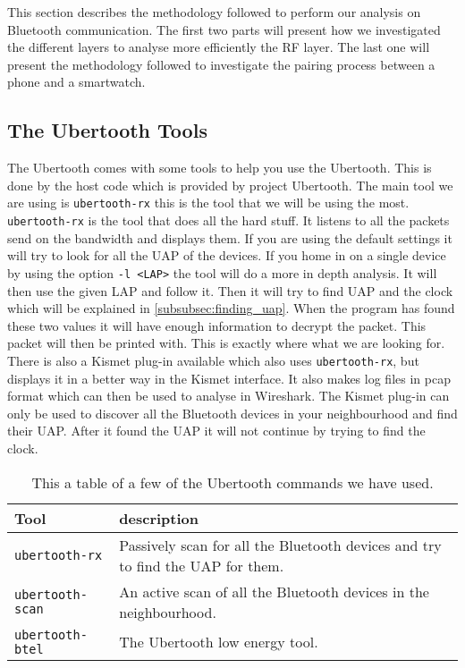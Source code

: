 This section describes the methodology followed to perform our analysis on Bluetooth communication. The first two parts will present how we investigated the different layers to analyse more efficiently the RF layer. The last one will present the methodology followed to investigate the pairing process between a phone and a smartwatch.


\subsection{The Ubertooth Tools}
\label{subsubsec:ubertooth_tools}
The Ubertooth comes with some tools to help you use the Ubertooth. This is done by the host code which is provided by project Ubertooth. 
The main tool we are using is \verb|ubertooth-rx|  this is the tool that we will be using the most. \verb|ubertooth-rx| is the tool that does all the hard stuff. It listens to all the packets send on the bandwidth and displays them. If you are using the default settings it will try to look for all the UAP of the devices. If you home in on a single device by using the option \verb|-l <LAP>| the tool will do a more in depth analysis. It will then use the given LAP and follow it. Then it will try to find UAP and the clock which will be explained in \ref{subsubsec:finding_uap}. When the program has found these two values it will have enough information to decrypt the packet. This packet will then be printed with. This is exactly where what we are looking for. \pend There is also a Kismet plug-in available which also uses \verb|ubertooth-rx|, but displays it in a better way in the Kismet interface. It also makes log files in pcap format which can then be used to analyse in Wireshark. The Kismet plug-in can only be used to discover all the Bluetooth devices in your neighbourhood and find their UAP. After it found the UAP it will not continue by trying to find the clock.

\begin{table}
\begin{tabular}{|l|l|}
\hline
Tool & description \\
\hline
\verb|ubertooth-rx| & Passively scan for all the Bluetooth devices and try to find the UAP for them. \\
\hline
\verb|ubertooth-scan| & An active scan of all the Bluetooth devices in the neighbourhood.  \\
\hline
\verb|ubertooth-btel| & The Ubertooth low energy tool. \\
\hline
\end{tabular}
\caption{This a table of a few of the Ubertooth commands we have used.}
\label{tab:ubertooth_tools}
\end{table}
